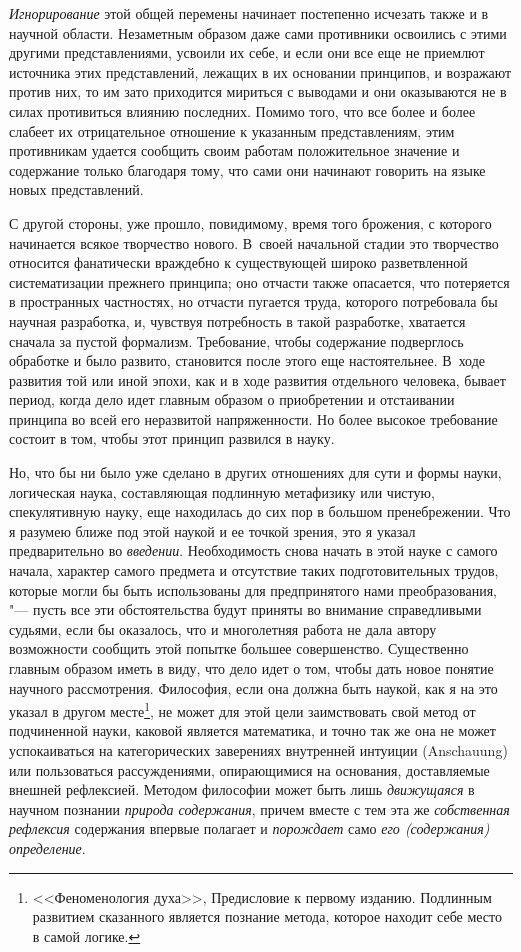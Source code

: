 {\em Игнорирование} этой общей перемены начинает
постепенно исчезать также и в научной области. Незаметным образом даже сами
противники освоились с этими другими представлениями, усвоили их себе, и
если они все еще не приемлют источника этих представлений, лежащих в их
основании принципов, и возражают против них, то им зато приходится мириться
с выводами и они оказываются не в силах противиться влиянию последних.
Помимо того, что все более и более слабеет их отрицательное отношение к
указанным представлениям, этим противникам удается сообщить своим работам
положительное значение и содержание только благодаря тому, что сами они
начинают говорить на языке новых представлений.

С другой стороны, уже прошло, повидимому, время того брожения, с которого
начинается всякое творчество нового. В~своей начальной стадии это
творчество относится фанатически враждебно к существующей широко
разветвленной систематизации прежнего принципа; оно отчасти также
опасается, что потеряется в пространных частностях, но отчасти пугается
труда, которого потребовала бы научная разработка, и, чувствуя потребность
в такой разработке, хватается сначала за пустой формализм. Требование,
чтобы содержание подверглось обработке и было развито, становится после
этого еще настоятельнее. В~ходе развития той или иной эпохи, как и в ходе
развития отдельного человека, бывает период, когда дело идет главным
образом о приобретении и отстаивании принципа во всей его неразвитой
напряженности. Но более высокое требование состоит в том, чтобы этот
принцип развился в науку.

Но, что бы ни было уже сделано в других отношениях для сути и формы науки,
логическая наука, составляющая подлинную метафизику или чистую,
спекулятивную науку, еще находилась до сих пор в большом пренебрежении. Что
я разумею ближе под этой наукой и ее точкой зрения, это я указал
предварительно во {\em введении}. Необходимость снова
начать в этой науке с самого начала, характер самого предмета и отсутствие
таких подготовительных трудов, которые могли бы быть использованы для
предпринятого нами преобразования, "--- пусть все эти обстоятельства будут
приняты во внимание справедливыми судьями, если бы оказалось, что и
многолетняя работа не дала автору возможности сообщить этой попытке большее
совершенство. Существенно главным образом иметь в виду, что дело идет о
том, чтобы дать новое понятие научного рассмотрения. Философия, если она
должна быть наукой, как я на это указал в другом
месте\footnote{<<Феноменология духа>>, Предисловие к первому изданию.
Подлинным развитием сказанного является познание метода, которое находит
себе место в самой
логике.},
не может для этой цели заимствовать свой метод от подчиненной науки,
каковой является математика, и точно так же она не может успокаиваться на
категорических заверениях внутренней интуиции (Anschauung) или пользоваться
рассуждениями, опирающимися на основания, доставляемые внешней рефлексией.
Методом философии может быть лишь {\em движущаяся} в
научном познании {\em природа содержания}, причем
вместе с тем эта же {\em собственная рефлексия}
содержания впервые полагает и {\em порождает} само
{\em его (содержания) определение}.

